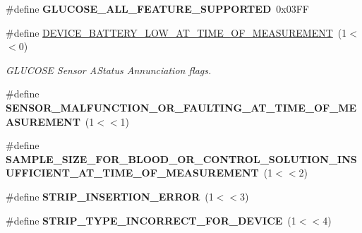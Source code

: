 \begin{DoxyCompactItemize}
\item 
\#define {\bfseries G\+L\+U\+C\+O\+S\+E\+\_\+\+A\+L\+L\+\_\+\+F\+E\+A\+T\+U\+R\+E\+\_\+\+S\+U\+P\+P\+O\+R\+T\+ED}~0x03\+FF\hypertarget{group___b_l_e___g_s_ga01464d3cc188bc4c160e946bcd3ec69c}{}\label{group___b_l_e___g_s_ga01464d3cc188bc4c160e946bcd3ec69c}

\item 
\#define \hyperlink{group___b_l_e___g_s_gab5c0409cac8d6c9f649bf66fe348851d}{D\+E\+V\+I\+C\+E\+\_\+\+B\+A\+T\+T\+E\+R\+Y\+\_\+\+L\+O\+W\+\_\+\+A\+T\+\_\+\+T\+I\+M\+E\+\_\+\+O\+F\+\_\+\+M\+E\+A\+S\+U\+R\+E\+M\+E\+NT}~(1$<$$<$0)\hypertarget{group___b_l_e___g_s_gab5c0409cac8d6c9f649bf66fe348851d}{}\label{group___b_l_e___g_s_gab5c0409cac8d6c9f649bf66fe348851d}

\begin{DoxyCompactList}\small\item\em G\+L\+U\+C\+O\+SE Sensor A\+Status Annunciation flags. \end{DoxyCompactList}\item 
\#define {\bfseries S\+E\+N\+S\+O\+R\+\_\+\+M\+A\+L\+F\+U\+N\+C\+T\+I\+O\+N\+\_\+\+O\+R\+\_\+\+F\+A\+U\+L\+T\+I\+N\+G\+\_\+\+A\+T\+\_\+\+T\+I\+M\+E\+\_\+\+O\+F\+\_\+\+M\+E\+A\+S\+U\+R\+E\+M\+E\+NT}~(1$<$$<$1)\hypertarget{group___b_l_e___g_s_gacc6450b30084cc6554c8654bcbc25e2f}{}\label{group___b_l_e___g_s_gacc6450b30084cc6554c8654bcbc25e2f}

\item 
\#define {\bfseries S\+A\+M\+P\+L\+E\+\_\+\+S\+I\+Z\+E\+\_\+\+F\+O\+R\+\_\+\+B\+L\+O\+O\+D\+\_\+\+O\+R\+\_\+\+C\+O\+N\+T\+R\+O\+L\+\_\+\+S\+O\+L\+U\+T\+I\+O\+N\+\_\+\+I\+N\+S\+U\+F\+F\+I\+C\+I\+E\+N\+T\+\_\+\+A\+T\+\_\+\+T\+I\+M\+E\+\_\+\+O\+F\+\_\+\+M\+E\+A\+S\+U\+R\+E\+M\+E\+NT}~(1$<$$<$2)\hypertarget{group___b_l_e___g_s_ga6911413ac1ab2cc2206cb8881c0a6317}{}\label{group___b_l_e___g_s_ga6911413ac1ab2cc2206cb8881c0a6317}

\item 
\#define {\bfseries S\+T\+R\+I\+P\+\_\+\+I\+N\+S\+E\+R\+T\+I\+O\+N\+\_\+\+E\+R\+R\+OR}~(1$<$$<$3)\hypertarget{group___b_l_e___g_s_ga24c13503095399e6c71f12aab955c0a0}{}\label{group___b_l_e___g_s_ga24c13503095399e6c71f12aab955c0a0}

\item 
\#define {\bfseries S\+T\+R\+I\+P\+\_\+\+T\+Y\+P\+E\+\_\+\+I\+N\+C\+O\+R\+R\+E\+C\+T\+\_\+\+F\+O\+R\+\_\+\+D\+E\+V\+I\+CE}~(1$<$$<$4)\hypertarget{group___b_l_e___g_s_ga4bbc015e1dcf9962772d07f0b25059cc}{}\label{group___b_l_e___g_s_ga4bbc015e1dcf9962772d07f0b25059cc}


\end{DoxyCompactItemize}
